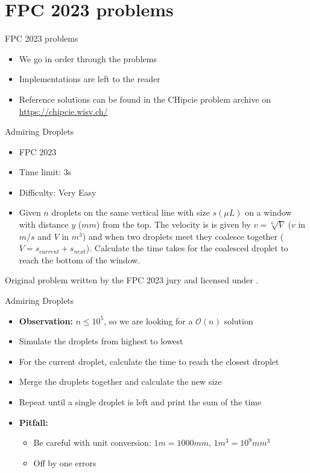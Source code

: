 \documentclass[11pt,pdf, aspectratio=169]{beamer}
\begin{document}
  \section{FPC 2023 problems}\label{sec:fpc-2023-problems}
  \begin{frame}{FPC 2023 problems}
    \begin{itemize}
      \item We go in order through the problems
      \item Implementations are left to the reader
      \item Reference solutions can be found in the CHipcie problem archive on \url{https://chipcie.wisv.ch/}
    \end{itemize}
  \end{frame}
  \begin{frame}{Admiring Droplets}
    \begin{itemize}
      \item FPC 2023
      \item Time limit: 3s
      \item Difficulty: Very Easy
      \item Given $n$ droplets on the same vertical line with size $s (\mu L)$ on a window with distance $y$ ($mm$) from the top.
      The velocity is is given by $v = \sqrt[6]{V}$ ($v$ in $m/s$ and $V$ in $m^3$) and when two droplets meet they coalesce together ($V=s_{current}+s_{next}$).
      Calculate the time takes for the coalesced droplet to reach the bottom of the window.
    \end{itemize}
    Original problem written by the FPC 2023 jury and licensed under \doclicenseLongNameRef.

    \doclicenseImage

  \end{frame}
  \begin{frame}{Admiring Droplets}
    \begin{itemize}
      \item<1-> \textbf{Observation:} $n \leq 10^5$, so we are looking for a $\mathcal{O}(n)$ solution
      \item<2-> Simulate the droplets from highest to lowest
      \item<3-> For the current droplet, calculate the time to reach the closest droplet
      \item<4-> Merge the droplets together and calculate the new size
      \item<4-> Repeat until a single droplet is left and print the sum of the time
      \item<4-> \textbf{Pitfall:} \begin{itemize}
                                    \item Be careful with unit conversion: $1m = 1000mm$, $1 m^3=10^{9}mm^3$
                                    \item Off by one errors
      \end{itemize}
    \end{itemize}
  \end{frame}
\end{document}

